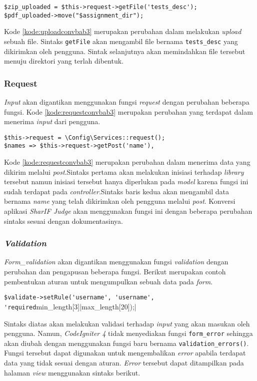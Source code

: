 \begin{lstlisting}[caption=Contoh perubahan \textit{library upload}, label=kode:uploadconvbab3]
$zip_uploaded = $this->request->getFile('tests_desc');
$pdf_uploaded->move("$assignment_dir");
\end{lstlisting}

Kode \ref{kode:uploadconvbab3} merupakan perubahan dalam melakukan \textit{upload} sebuah file. Sintaks \texttt{getFile} akan mengambil file bernama \texttt{tests\_desc} yang dikirimkan oleh pengguna. Sintak selanjutnya akan memindahkan file tersebut menuju direktori yang terlah dibentuk.

\subsubsection{Request}
\textit{Input} akan digantikan menggunakan fungsi \textit{request} dengan perubahan beberapa fungsi. Kode \ref{kode:requestconvbab3} merupakan perubahan yang terdapat dalam menerima \textit{input} dari pengguna.

\begin{lstlisting}[caption=Contoh perubahan \textit{library request}, label=kode:requestconvbab3]
$this->request = \Config\Services::request(); 
$names => $this->request->getPost('name'),
\end{lstlisting}

Kode \ref{kode:requestconvbab3} merupakan perubahan dalam menerima data yang dikirim melalui \textit{post}.Sintaks pertama akan melakukan inisiasi terhadap \textit{library} tersebut namun inisiasi tersebut hanya diperlukan pada \textit{model} karena fungsi ini sudah terdapat pada \textit{controller}.Sintaks baris kedua akan mengambil data bernama \textit{name} yang telah dikirimkan oleh pengguna melalui \textit{post}. Konversi aplikasi \textit{SharIF Judge} akan menggunakan fungsi ini dengan beberapa perubahan sintaks sesuai dengan dokumentasinya.

\subsubsection{\textit{Validation}}
\textit{Form\_validation} akan digantikan menggunakan fungsi \textit{validation} dengan perubahan dan pengapusan beberapa fungsi. Berikut merupakan contoh pembentukan aturan untuk mengumpulkan sebuah data pada \textit{form}.
\begin{center}
\verb|$validate->setRule('username', 'username', 'required|min\_length[3]|max\_length[20]);|
\end{center}
Sintaks diatas akan melakukan validasi terhadap \textit{input} yang akan masukan oleh pengguna. Namun, \textit{CodeIgniter 4} tidak menyediakan fungsi \texttt{form\_error} sehingga akan diubah dengan menggunakan fungsi baru bernama \texttt{validation\_errors()}. Fungsi tersebut dapat digunakan untuk mengembalikan \textit{error} apabila terdapat data yang tidak sesuai dengan aturan. \textit{Error} tersebut dapat ditampilkan pada halaman \textit{view} menggunakan sintaks berikut.

